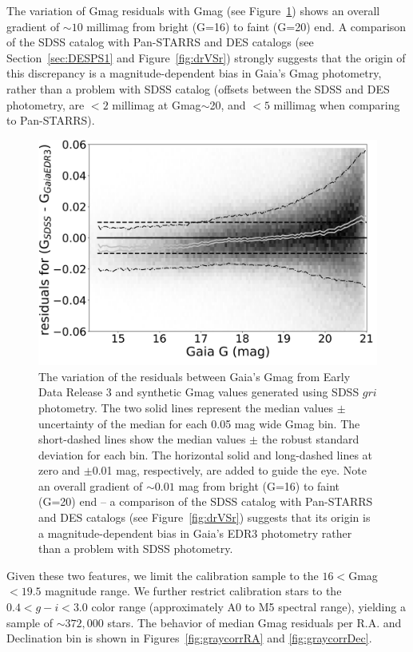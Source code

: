\documentclass[fleqn,usenatbib]{mnras}
\begin{document}
The variation of Gmag residuals with Gmag (see Figure~\ref{fig:gaiaJump}) shows 
an overall gradient of $\sim10$ millimag from bright (G=16) to faint (G=20) end. 
A comparison of the SDSS catalog with Pan-STARRS and DES catalogs (see 
Section~\ref{sec:DESPS1} and Figure~\ref{fig:drVSr}) strongly suggests that the
origin of this discrepancy is a magnitude-dependent bias in Gaia's Gmag photometry,
rather than a problem with SDSS catalog (offsets between the SDSS and DES
photometry,  are $<2$ millimag at Gmag$\sim$20, and $<5$ millimag when
comparing to Pan-STARRS). 


\begin{figure}
    \centering\includegraphics[width=0.95\columnwidth]{figures/GmagCorrectionTest_Gmag_Hess.png} 
\caption{The variation of the residuals between Gaia's Gmag from Early Data Release 3
and synthetic Gmag values generated using SDSS $gri$ photometry. The two solid 
lines represent the median values $\pm$ uncertainty of the median for each
0.05 mag wide Gmag bin. The short-dashed lines show the median values $\pm$ 
the robust standard deviation for each bin. The horizontal solid and long-dashed 
lines at zero and $\pm$0.01 mag, respectively, are added to guide the eye.
Note an overall gradient of $\sim0.01$ mag from bright (G=16) to faint (G=20) 
end -- a comparison of the SDSS catalog with Pan-STARRS and DES catalogs (see 
Figure~\ref{fig:drVSr}) suggests that its origin is a magnitude-dependent bias in
 Gaia's EDR3 photometry rather than a problem with SDSS photometry.}
\label{fig:gaiaJump}
\end{figure}


Given these two features, we limit the calibration sample to the $16<$Gmag$<19.5$
magnitude range. We further restrict calibration stars to the $0.4 < g-i < 3.0$ color 
range (approximately A0 to M5 spectral range), yielding a sample of $\sim372,000$ stars. 
The behavior of median Gmag residuals per R.A. and Declination bin is shown in 
Figures~\ref{fig:graycorrRA} and \ref{fig:graycorrDec}. 
\end{document}
